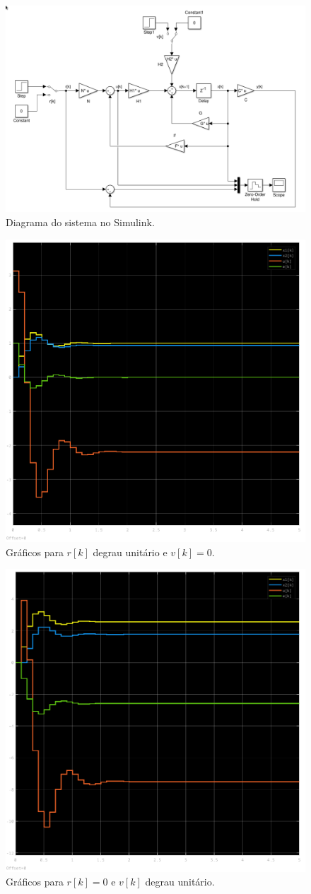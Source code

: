 \documentclass{article}
\begin{document}
    \begin{figure}[H]
        \centering
        \includegraphics[width=.8\linewidth]{images/simulink_q1.png}
        \caption{Diagrama do sistema no Simulink.}\label{fig:simulink_q1}
    \end{figure}

    \begin{figure}[H]
        \centering
        \includegraphics[width=.6\linewidth]{images/q1_r1_v0.png}
        \caption{Gráficos para $r[k]$ degrau unitário e $v[k]=0$.}\label{fig:q1_r1_v0}
    \end{figure}

    \begin{figure}[H]
        \centering
        \includegraphics[width=.6\linewidth]{images/q1_r0_v1.png}
        \caption{Gráficos para $r[k]=0$ e $v[k]$ degrau unitário.}\label{fig:q1_r0_v1}
    \end{figure}
\end{document}
